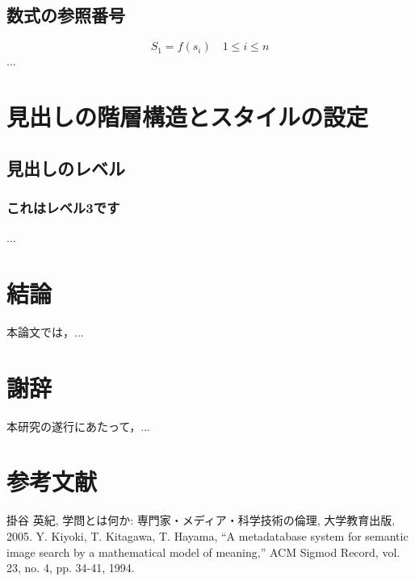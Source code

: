 \documentclass[titlepage,12pt]{ltjsarticle}
\begin{document}
\section{数式の参照番号}
\begin{equation}
    S_1 = f(s_i) \quad 1 \leq i \leq n
\end{equation}
...

\chapter{見出しの階層構造とスタイルの設定}
\section{見出しのレベル}
\subsection{これはレベル3です}
...

\chapter{結論}
本論文では，...

\chapter*{謝辞}
本研究の遂行にあたって，...

\chapter*{参考文献}
\begin{thebibliography}{9}
     掛谷 英紀, 学問とは何か: 専門家・メディア・科学技術の倫理, 大学教育出版, 2005.
     Y. Kiyoki, T. Kitagawa, T. Hayama, ``A metadatabase system for semantic image search by a mathematical model of meaning,'' ACM Sigmod Record, vol. 23, no. 4, pp. 34-41, 1994.
\end{thebibliography}
\end{document}
